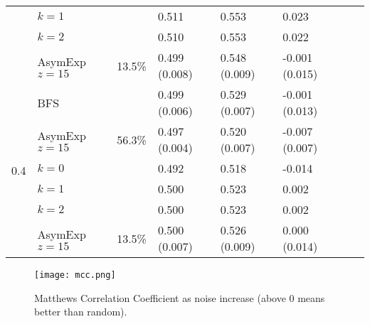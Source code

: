\documentclass[a4paper,final,notitlepage,11pt,svgnames]{scrartcl}
\begin{document}
\begin{table}[htpb]
\begin{tabular}{llllllll}
		                      & $k=1$          &              & 0.511         & 0.553         & 0.023          &               & \\
		                      & $k=2$          &              & 0.510         & 0.553         & 0.022          &               & \\
		                      & AsymExp $z=15$ & 13.5\%       & 0.499 (0.008) & 0.548 (0.009) & -0.001 (0.015) &               &    \\
		\cmidrule(r){2-6}
		\multirow{6}{*}{0.4}  & BFS            &              & 0.499 (0.006) & 0.529 (0.007) & -0.001 (0.013) &               & \\
		                      & AsymExp $z=15$ & 56.3\%       & 0.497 (0.004) & 0.520 (0.007) & -0.007 (0.007) &               &    \\
		                      & $k=0$          &              & 0.492         & 0.518         & -0.014         &               & \\
		                      & $k=1$          &              & 0.500         & 0.523         & 0.002          &               & \\
		                      & $k=2$          &              & 0.500         & 0.523         & 0.002          &               & \\
		                      & AsymExp $z=15$ & 13.5\%       & 0.500 (0.007) & 0.526 (0.009) & 0.000 (0.014)  &               &    \\
		\bottomrule
	\end{tabular}
\end{table}

\begin{figure}[htpb]
	\centering
	\texttt{[image: mcc.png]}
	\caption{Matthews Correlation Coefficient as noise increase (above 0 means better than random).
	\label{fig:mcc}}
\end{figure}
\end{document}
